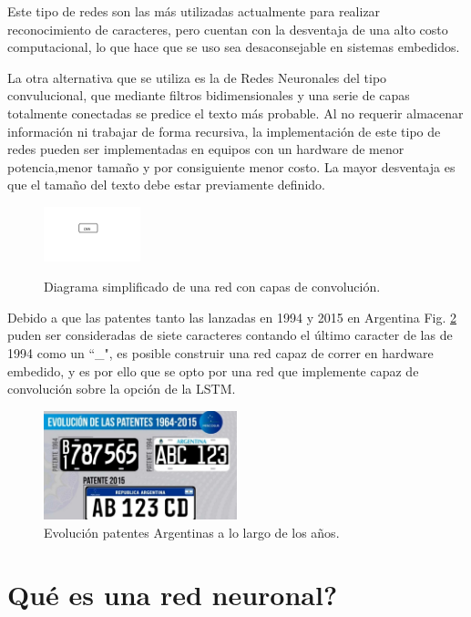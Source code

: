 Este tipo de redes son las más utilizadas actualmente para realizar reconocimiento de caracteres, pero cuentan con la desventaja de una alto costo computacional, lo que hace que se uso sea desaconsejable en sistemas embedidos.

La otra alternativa que se utiliza es la de Redes Neuronales del tipo convulucional, que mediante filtros bidimensionales y una serie de capas totalmente conectadas se predice el texto más probable.
Al no requerir almacenar información ni trabajar de forma recursiva, la implementación
de este tipo de redes pueden ser implementadas en equipos con un hardware de menor potencia,menor tamaño y por consiguiente menor costo. La mayor desventaja es que el tamaño del texto debe estar previamente definido.
\begin{figure}[h]
    \centering
    \includegraphics[width=0.25\textwidth]{imgs/CNN-diagrama.jpg}
    \label{fig:diagrama-CNN}
    \caption{Diagrama simplificado de una red con capas de convolución.}
\end{figure}

Debido a que las patentes tanto las lanzadas en 1994 y 2015 en Argentina Fig. \ref{fig:patentes-arg} puden ser consideradas de siete caracteres contando el último caracter de las de 1994 como un ``\_", es posible construir una red capaz de correr en hardware embedido, y es por ello que se opto por una red que implemente capaz de convolución sobre la opción de la LSTM.

\begin{figure}[h]
    \centering
    \includegraphics[width=0.5\textwidth]{imgs/patentes-arg.png}
    \caption{Evolución patentes Argentinas a lo largo de los años.}
    \label{fig:patentes-arg}
\end{figure}


\section{Qué es una red neuronal?}


